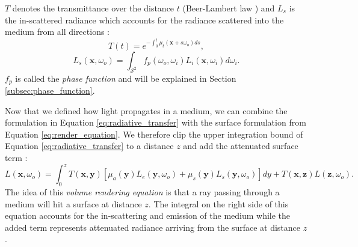 $T$ denotes the transmittance over the distance $t$ (Beer-Lambert law \cite{lambert}) and $L_s$ is the in-scattered radiance which accounts for the radiance scattered into the medium from all directions \cite{novak_overview}:
\begin{equation}
    \label{eq:beer_lambert_law}
    T(t) = e^{-\int_0^t \mu_t(\boldsymbol{x} + s\omega_o)ds},
\end{equation}
\begin{equation}
    \label{eq:in_scattered_radiance}
    L_s(\boldsymbol{x}, \omega_o) = \int_{\mathcal{S}^2} f_p(\omega_o, \omega_i)L_i(\boldsymbol{x}, \omega_i)d\omega_i.
\end{equation}
$f_p$ is called the \textit{phase function} and will be explained in Section \ref{subsec:phase_function}.

Now that we defined how light propagates in a medium, we can combine the formulation in Equation \ref{eq:radiative_transfer} with the surface formulation from Equation \ref{eq:render_equation}.
We therefore clip the upper integration bound of Equation \ref{eq:radiative_transfer} to a distance $z$ and add the attenuated surface term \cite{novak_overview}:
\begin{equation*}
    L(\boldsymbol{x}, \omega_o) = \int_0^z T(\boldsymbol{x}, \boldsymbol{y})[\mu_a(\boldsymbol{y})L_e(\boldsymbol{y}, \omega_o) + \mu_s(\boldsymbol{y})L_s(\boldsymbol{y}, \omega_o)]dy + T(\boldsymbol{x}, \boldsymbol{z})L(\boldsymbol{z}, \omega_o).
\end{equation*}
The idea of this \textit{volume rendering equation} is that a ray passing through a medium will hit a surface at distance $z$.
The integral on the right side of this equation accounts for the in-scattering and emission of the medium while the added term represents attenuated radiance arriving from the surface at distance $z$ \cite{novak_overview}.

